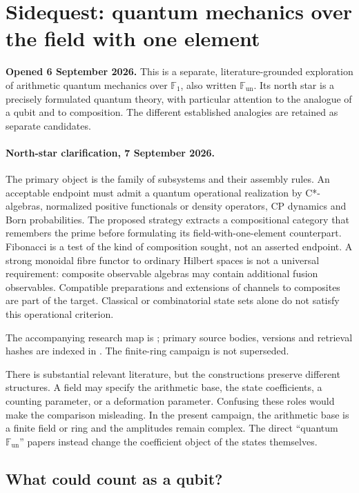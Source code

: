 \clearpage
\section{Sidequest: quantum mechanics over the field with one element}
\label{sec:sidequest-f1}

\textbf{Opened 6 September 2026.} This is a separate, literature-grounded
exploration of arithmetic quantum mechanics over $\mathbb F_1$, also written
$\mathbb F_{\mathrm{un}}$. Its north star is a precisely formulated quantum
theory, with particular attention to the analogue of a qubit and to composition.
The different established analogies are retained as separate candidates.

\paragraph{North-star clarification, 7 September 2026.}
The primary object is the family of subsystems and their assembly rules.
An acceptable endpoint must admit a quantum operational realization by
C*-algebras, normalized positive functionals or density operators, CP
dynamics and Born probabilities. The proposed strategy extracts a
compositional category that remembers the prime before formulating its
field-with-one-element counterpart. Fibonacci is a test of the kind of
composition sought, not an asserted endpoint. A strong monoidal fibre
functor to ordinary Hilbert spaces is not a universal requirement:
composite observable algebras may contain additional fusion observables.
Compatible preparations and extensions of channels to composites are
part of the target. Classical or combinatorial state sets alone do not
satisfy this operational criterion.

The accompanying research map is ; primary
source bodies, versions and retrieval hashes are indexed in
. The finite-ring campaign is not superseded.

There is substantial relevant literature, but the constructions preserve
different structures. A field may specify the arithmetic base, the state
coefficients, a counting parameter, or a deformation parameter. Confusing
these roles would make the comparison misleading. In the present campaign,
the arithmetic base is a finite field or ring and the amplitudes remain
complex. The direct ``quantum $\mathbb F_{\mathrm{un}}$'' papers instead
change the coefficient object of the states themselves.

\subsection{What could count as a qubit?}

